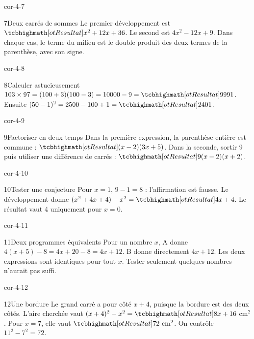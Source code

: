 \begin{blocLivre}{cor-4-7}\begin{corrige}{7}{Deux carrés de sommes}
Le premier développement est $\res{x^2+12x+36}$. Le second est $4x^2-12x+9$. Dans chaque cas, le terme du milieu est le double produit des deux termes de la parenthèse, avec son signe.
\end{corrige}\end{blocLivre}
\begin{blocLivre}{cor-4-8}\begin{corrige}{8}{Calculer astucieusement}
$103\times97=(100+3)(100-3)=10000-9=\res{9991}$. Ensuite $(50-1)^2=2500-100+1=\res{2401}$.
\end{corrige}\end{blocLivre}
\begin{blocLivre}{cor-4-9}\begin{corrige}{9}{Factoriser en deux temps}
Dans la première expression, la parenthèse entière est commune : $\res{(x-2)(3x+5)}$. Dans la seconde, sortir 9 puis utiliser une différence de carrés : $\res{9(x-2)(x+2)}$.
\end{corrige}\end{blocLivre}
\begin{blocLivre}{cor-4-10}\begin{corrige}{10}{Tester une conjecture}
Pour $x=1$, $9-1=8$ : l’affirmation est fausse. Le développement donne $(x^2+4x+4)-x^2=\res{4x+4}$. Le résultat vaut 4 uniquement pour $x=0$.
\end{corrige}\end{blocLivre}
\begin{blocLivre}{cor-4-11}\begin{corrige}{11}{Deux programmes équivalents}
Pour un nombre $x$, A donne $4(x+5)-8=4x+20-8=4x+12$. B donne directement $4x+12$. Les deux expressions sont identiques pour tout $x$. Tester seulement quelques nombres n’aurait pas suffi.
\end{corrige}\end{blocLivre}
\begin{blocLivre}{cor-4-12}\begin{corrige}{12}{Une bordure}
Le grand carré a pour côté $x+4$, puisque la bordure est des deux côtés. L’aire cherchée vaut $(x+4)^2-x^2=\res{8x+16}$ cm$^2$. Pour $x=7$, elle vaut $\res{72\text{ cm}^2}$. On contrôle $11^2-7^2=72$.
\label{fig-cor-4-12}
\end{corrige}\end{blocLivre}
